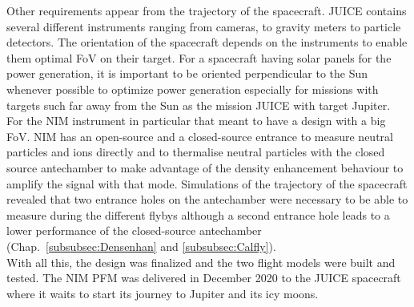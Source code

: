 	Other requirements appear from the trajectory of the spacecraft. JUICE contains several different instruments ranging from cameras, to gravity meters to particle detectors. The orientation of the spacecraft depends on the instruments to enable them optimal FoV on their target. For a spacecraft having solar panels for the power generation, it is important to be oriented perpendicular to the Sun whenever possible to optimize power generation especially for missions with targets such far away from the Sun as the mission JUICE with target Jupiter. For the NIM instrument in particular that meant to have a design with a big FoV. NIM has an open-source and a closed-source entrance to measure neutral particles and ions directly and to thermalise neutral particles with the closed source antechamber to make advantage of the density enhancement behaviour to amplify the signal with that mode. Simulations of the trajectory of the spacecraft revealed that two entrance holes on the antechamber were necessary to be able to measure during the different flybys although a second entrance hole leads to a lower performance of the closed-source antechamber (Chap.~\ref{subsubsec:Densenhan} and \ref{subsubsec:Calfly}).\\
	
	With all this, the design was finalized and the two flight models were built and tested. The NIM PFM was delivered in December 2020 to the JUICE spacecraft where it waits to start its journey to Jupiter and its icy moons. 
	
	
	
	
	
	
	
	
	
	
	
	
	
	
	
	
	
	
	